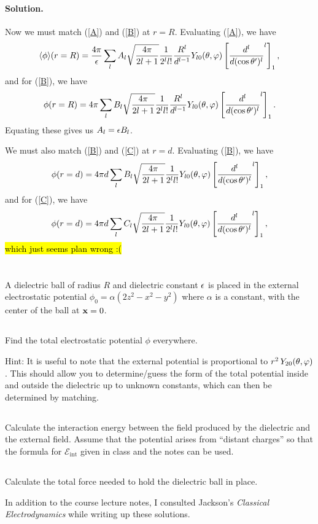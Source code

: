 \documentclass[11pt]{article}
\newcommand{\refeq}[1]{(\ref{#1})}
\newcommand{\beq}{\begin{equation*}}
\newcommand{\eeq}{\end{equation*}}
\newenvironment{statement}[1]
{
	\section{#1}
	\color{darkgray}
	\ignorespaces
}
{
}
\newenvironment{problem}
{
	\subsection{}
	\color{darkgray}
    \ignorespaces
}
{

}
\newenvironment{solution}
{
    \paragraph{Solution.}
    \ignorespaces
}
{
    \bigskip
}
\begin{document}
\begin{solution}
	Now we must match \refeq{A} and \refeq{B} at $r = R$.  Evaluating \refeq{A}, we have
	\beq
		\evphi\!(r=R) = \frac{4\pi}{\eps} \sum_{l} \Al  \sqrt{\frac{4\pi}{2l + 1}} \frac{1}{2^l l!} \frac{R^l}{d^{l-1}} Y_{l 0}\tv \left[ \dv[l]{}{(\cost')} (\cos^2\tht' - 1)^l \right]_1,
	\eeq
	and for \refeq{B}, we have
	\beq
		\phi(r=R) = 4\pi \sum_{l} \Bl \sqrt{\frac{4\pi}{2l + 1}} \frac{1}{2^l l!} \frac{R^l}{d^{l-1}} Y_{l 0}\tv \left[ \dv[l]{}{(\cost')} (\cos^2\tht' - 1)^l \right]_1.
	\eeq
	Equating these gives us $A_l = \epsilon B_l$.
	
	We must also match \refeq{B} and \refeq{C} at $r = d$.  Evaluating \refeq{B}, we have
	\beq
		\phi(r=d) = 4\pi d \sum_{l} \Bl \sqrt{\frac{4\pi}{2l + 1}} \frac{1}{2^l l!} Y_{l 0}\tv \left[ \dv[l]{}{(\cost')} (\cos^2\tht' - 1)^l \right]_1,
	\eeq
	and for \refeq{C}, we have
	\beq
		\phi(r=d) = 4\pi d \sum_{l} \Cl \sqrt{\frac{4\pi}{2l + 1}} \frac{1}{2^l l!} Y_{l 0}\tv \left[ \dv[l]{}{(\cost')} (\cos^2\tht' - 1)^l \right]_1,
	\eeq
	\hl{which just seems plan wrong :(}
	
\end{solution}



\newcommand{\phio}{\phi_0}
\newcommand{\alp}{\alpha}
\newcommand{\cE}{\mathcal{E}}
\newcommand{\cEint}{\cE_\text{int}}

\begin{statement}{}
	A dielectric ball of radius $R$ and dielectric constant $\epsilon$ is placed in the external electrostatic potential $\phio = \alp (2z^2 - x^2 - y^2)$ where $\alp$ is a constant, with the center of the ball at $\mathbf{x} = 0$.
\end{statement}

\begin{problem}
	Find the total electrostatic potential $\phi$ everywhere.
	
	Hint: It is useful to note that the external potential is proportional to $r^2 \, Y_{2 0}(\theta, \varphi)$.  This should allow you to determine/guess the form of the total potential inside and outside the dielectric up to unknown constants, which can then be determined by matching.
\end{problem}

\begin{problem}
	Calculate the interaction energy between the field produced by the dielectric and the external field.  Assume that the potential arises from ``distant charges'' so that the formula for $\cEint$ given in class and the notes can be used.
\end{problem}

\begin{problem}
	Calculate the total force needed to hold the dielectric ball in place.
\end{problem}



\vfill
In addition to the course lecture notes, I consulted Jackson's \emph{Classical Electrodynamics} while writing up these solutions.
\end{document}
